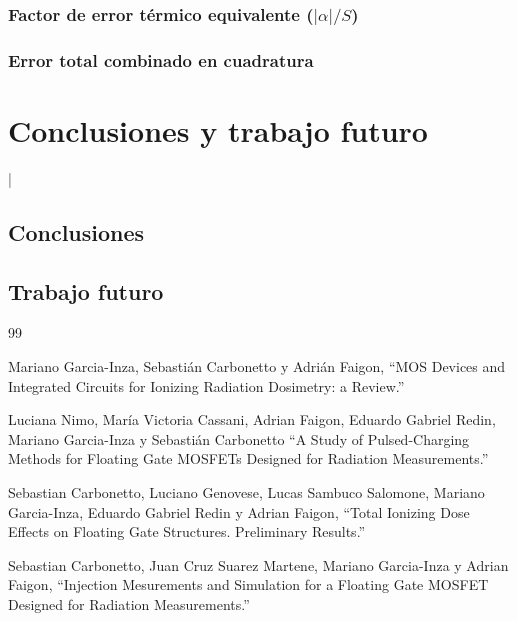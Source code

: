\documentclass[12pt,a4paper,oneside]{book}
\begin{document}
\subsection{Factor de error térmico equivalente \texorpdfstring{($|\alpha| / S$)}{(|alpha| / S)}}
\subsection{Error total combinado en cuadratura}


\chapter{Conclusiones y trabajo futuro}
|
\section{Conclusiones}

\section{Trabajo futuro}


\begin{thebibliography}{99}

Mariano Garcia-Inza, Sebastián Carbonetto y Adrián Faigon,
``MOS Devices and Integrated Circuits for Ionizing Radiation Dosimetry: a Review.''

Luciana Nimo, María Victoria Cassani, Adrian Faigon, Eduardo Gabriel Redin, Mariano Garcia-Inza y Sebastián Carbonetto
``A Study of Pulsed-Charging Methods for Floating Gate MOSFETs Designed for Radiation Measurements.''

Sebastian Carbonetto, Luciano Genovese, Lucas Sambuco Salomone, Mariano Garcia-Inza, Eduardo Gabriel Redin y Adrian Faigon,
``Total Ionizing Dose Effects on Floating Gate Structures. Preliminary Results.''

Sebastian Carbonetto, Juan Cruz Suarez Martene, Mariano Garcia-Inza y Adrian Faigon,
``Injection Mesurements and Simulation for a Floating Gate MOSFET Designed for Radiation Measurements.''

\end{thebibliography}
\end{document}
